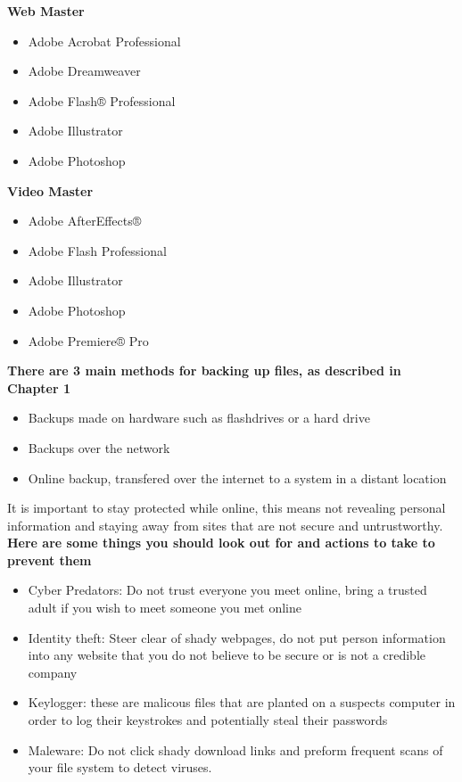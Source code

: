 \documentclass{report}
\begin{document}
    \bigbreak \noindent 
    \textbf{Web Master}
    \begin{itemize}
        \item Adobe Acrobat Professional
        \item  Adobe Dreamweaver
        \item  Adobe Flash® Professional
        \item  Adobe Illustrator
        \item Adobe Photoshop
    \end{itemize}

    \bigbreak \noindent 
    \textbf{Video Master}
    \begin{itemize}
       \item Adobe AfterEffects®
       \item Adobe Flash Professional
       \item Adobe Illustrator
       \item Adobe Photoshop
       \item Adobe Premiere® Pro
    \end{itemize}
    \bigbreak \noindent
    
    \noindent \textbf{There are 3 main methods for backing up files, as described in Chapter 1}
    \begin{itemize}
        \item Backups made on hardware such as flashdrives or a hard drive 
        \item Backups over the network
        \item Online backup, transfered over the internet to a system in a distant location
    \end{itemize}
    \bigbreak \noindent

    It is important to stay protected while online, this means 
    not revealing personal information and staying away from sites that are
    not secure and untrustworthy. \textbf{Here are some things you should look out for 
    and actions to take to prevent them}

    \bigbreak \noindent 
    \begin{itemize}
        \item Cyber Predators: Do not trust everyone you meet online, bring a trusted 
            adult if you wish to meet someone you met online
        \item Identity theft: Steer clear of shady webpages, do not put person information
            into any website that you do not believe to be secure or is not a credible company
        \item Keylogger: these are malicous files that are planted on a suspects computer 
            in order to log their keystrokes and potentially steal their passwords
        \item Maleware: Do not click shady download links and preform frequent scans
            of your file system to detect viruses.
    \end{itemize}
    \bigbreak \noindent
\end{document}
